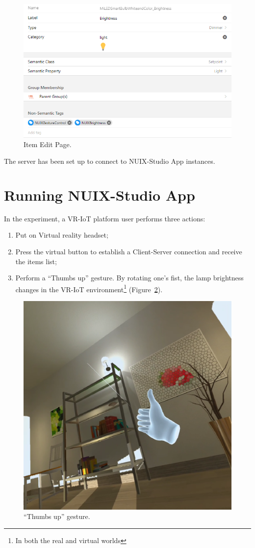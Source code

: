 \begin{figure}
  \centering
  \includegraphics[width = 0.9 \linewidth]{figures/ItemEditPage.png}
  \caption{Item Edit Page.}
  \label{fig:ItemEditPage-figure}
\end{figure}

The server has been set up to connect to NUIX-Studio App instances.

\section{Running NUIX-Studio App}

In the experiment, a VR-IoT platform user performs three actions:
\begin{enumerate}
    \item Put on Virtual reality headset;
    \item Press the virtual button to establish a Client-Server connection and receive the items list;
    \item Perform a ``Thumbs up'' gesture. By rotating one's fist, the lamp brightness changes in the VR-IoT environment\footnote{In both the real and virtual worlds} (Figure~\ref{fig:FullBrightnessOculus-figure}).
\end{enumerate}


\begin{figure}
  \centering
  \includegraphics[width = 0.6 \linewidth]{figures/FullBrightnessOculus.png}
  \caption{``Thumbs up'' gesture.}
  \label{fig:FullBrightnessOculus-figure}
\end{figure}

